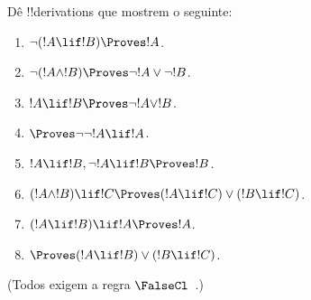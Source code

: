 \documentclass[../../../include/open-logic-section]{subfiles}
\begin{document}
\begin{prob}
Dê !!{derivation}s que mostrem o seguinte:
\begin{enumerate}
\item $\lnot(!A \lif !B) \Proves !A$.
\item $\lnot(!A \land !B) \Proves \lnot !A \lor \lnot !B$.
\item $!A \lif !B \Proves \lnot !A \lor !B$.
\item $\Proves \lnot \lnot !A \lif !A$.
\item $!A \lif !B, \lnot !A \lif !B \Proves !B$.
\item $(!A \land !B) \lif !C \Proves (!A \lif !C) \lor (!B \lif !C)$.
\item $(!A \lif !B) \lif !A \Proves !A$.
\item $\Proves (!A \lif !B) \lor (!B \lif !C)$.
\end{enumerate}
(Todos exigem a regra $\FalseCl$~.)
\end{prob}
\end{document}
